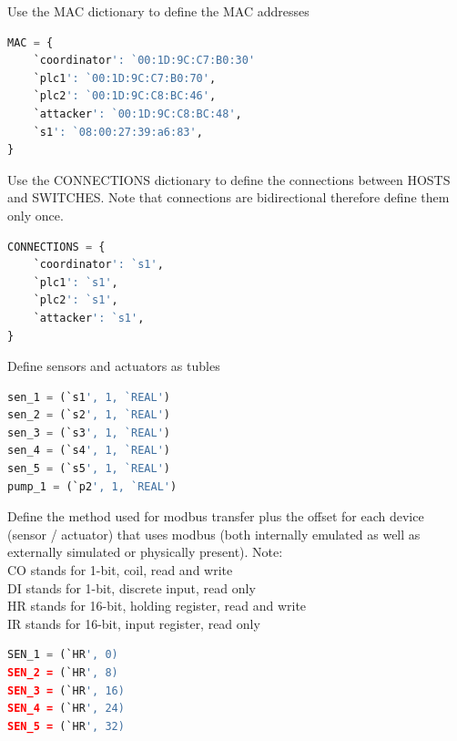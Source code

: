 \documentclass[book,a4paper,12pt]{memoir}
\begin{document}
\noindent Use the MAC dictionary to define the MAC addresses

\begin{lstlisting}[backgroundcolor = \color{ultralightgray}, language = Python, xleftmargin = 0.1cm, framexleftmargin = 0.3em, showstringspaces=false]
MAC = {
    `coordinator': `00:1D:9C:C7:B0:30'
    `plc1': `00:1D:9C:C7:B0:70',
    `plc2': `00:1D:9C:C8:BC:46',
    `attacker': `00:1D:9C:C8:BC:48',
    `s1': `08:00:27:39:a6:83',
}
\end{lstlisting}


\noindent Use the CONNECTIONS dictionary to define the connections between HOSTS and SWITCHES.  Note that connections are bidirectional therefore define them only once.

\begin{lstlisting}[backgroundcolor = \color{ultralightgray}, language = Python, xleftmargin = 0.1cm, framexleftmargin = 0.3em, showstringspaces=false]
CONNECTIONS = {
    `coordinator': `s1',
    `plc1': `s1',
    `plc2': `s1',
    `attacker': `s1',
}
\end{lstlisting}


\noindent Define sensors and actuators as tubles

\begin{lstlisting}[backgroundcolor = \color{ultralightgray}, language = Python, xleftmargin = 0.1cm, framexleftmargin = 0.3em, showstringspaces=false]
sen_1 = (`s1', 1, `REAL')
sen_2 = (`s2', 1, `REAL')
sen_3 = (`s3', 1, `REAL')
sen_4 = (`s4', 1, `REAL')
sen_5 = (`s5', 1, `REAL')
pump_1 = (`p2', 1, `REAL')
\end{lstlisting}


\noindent Define the method used for modbus transfer plus the offset for each device (sensor / actuator) that uses modbus (both internally emulated as well as externally simulated or physically present).  Note: 
\\CO stands for 1-bit, coil, read and write
\\DI  stands for 1-bit, discrete input, read only
\\HR stands for 16-bit, holding register, read and write
\\IR stands for 16-bit, input register, read only

\begin{lstlisting}[backgroundcolor = \color{ultralightgray}, language = Python, xleftmargin = 0.1cm, framexleftmargin = 0.3em, showstringspaces=false]
SEN_1 = (`HR', 0)
SEN_2 = (`HR', 8)
SEN_3 = (`HR', 16)
SEN_4 = (`HR', 24)
SEN_5 = (`HR', 32)
\end{lstlisting}
\end{document}
